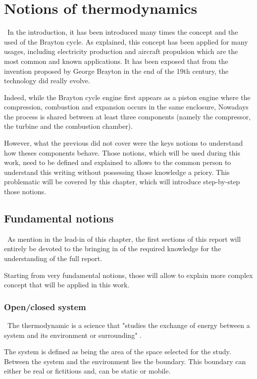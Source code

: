 \chapter{Notions of thermodynamics}
\quad\, In the introduction, it has been introduced many times the concept and the used of the Brayton cycle. As explained, this concept has been applied for many usages, including electricity production and aircraft propulsion which are the most common and known applications. It has been exposed that from the invention proposed by George Brayton in the end of the 19th century, the technology did really evolve.

Indeed, while the Brayton cycle engine first appears as a  piston engine where the compression, combustion and expansion occurs in the same enclosure, Nowadays 
the process is shared between at least three components (namely the compressor, the turbine and the combustion chamber).

However, what the previous did not cover were the keys notions to understand how theses components behave. Those notions, which will be used during this work, need to be defined and explained to allows to the common person to understand this writing without possessing those knowledge a priory. 
This problematic will be covered by this chapter, which will introduce step-by-step those notions.

\section{Fundamental notions}
\quad\, As mention in the lead-in of this chapter, the first sections of this report will entirely be devoted to the bringing in of the required knowledge for the understanding of the full report.

Starting from very fundamental notions, those will allow to explain more complex concept that will be applied in this work.
\newpage
\subsection{Open/closed system}\label{sect:C2_Sys}
\quad\,  The thermodynamic is a science that "studies the exchange of energy between a system and its environment or surrounding" \cite{thermoApp_1}.

The system is defined as being the area of the space selected for the study. Between the system and the environment lies the boundary. This boundary can either be real or fictitious and, can be static or mobile.

